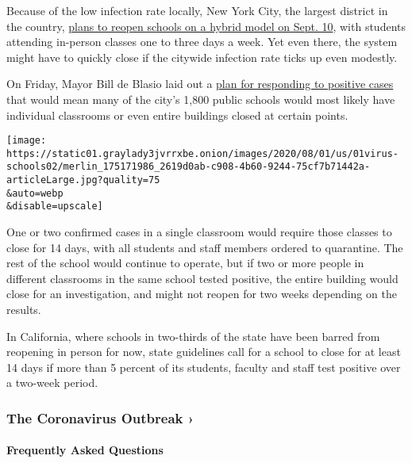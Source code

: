 Because of the low infection rate locally, New York City, the largest
district in the country,
\href{https://www.nytimes3xbfgragh.onion/2020/07/08/nyregion/nyc-schools-reopening-plan.html}{plans
to reopen schools on a hybrid model on Sept. 10}, with students
attending in-person classes one to three days a week. Yet even there,
the system might have to quickly close if the citywide infection rate
ticks up even modestly.

On Friday, Mayor Bill de Blasio laid out a
\href{https://www.nytimes3xbfgragh.onion/2020/07/30/world/coronavirus-covid-19.html\#link-177c5cda}{plan
for responding to positive cases} that would mean many of the city's
1,800 public schools would most likely have individual classrooms or
even entire buildings closed at certain points.

\texttt{[image: https://static01.graylady3jvrrxbe.onion/images/2020/08/01/us/01virus-schools02/merlin\_175171986\_2619d0ab-c908-4b60-9244-75cf7b71442a-articleLarge.jpg?quality=75\\\&auto=webp\\\&disable=upscale]}

One or two confirmed cases in a single classroom would require those
classes to close for 14 days, with all students and staff members
ordered to quarantine. The rest of the school would continue to operate,
but if two or more people in different classrooms in the same school
tested positive, the entire building would close for an investigation,
and might not reopen for two weeks depending on the results.

In California, where schools in two-thirds of the state have been barred
from reopening in person for now, state guidelines call for a school to
close for at least 14 days if more than 5 percent of its students,
faculty and staff test positive over a two-week period.

\href{https://www.nytimes3xbfgragh.onion/news-event/coronavirus?action=click\&pgtype=Article\&state=default\&region=MAIN_CONTENT_3\&context=storylines_faq}{}

\hypertarget{the-coronavirus-outbreak-}{%
\subsubsection{The Coronavirus Outbreak
›}\label{the-coronavirus-outbreak-}}

\hypertarget{frequently-asked-questions}{%
\paragraph{Frequently Asked
Questions}\label{frequently-asked-questions}}

